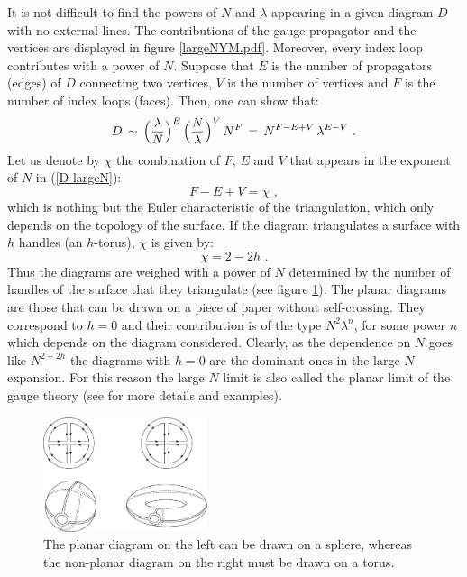 \documentclass[12pt,notitlepage,a4paper]{article}
\newcommand{\beq}{\begin{equation}}
\newcommand{\eeq}{\end{equation}}
\begin{document}
It is not difficult to find the powers of $N$ and $\lambda$ appearing in a given diagram $D$ with no external lines. The contributions of the gauge propagator and the vertices are displayed in figure \ref{largeNYM.pdf}.  Moreover, every index loop contributes with a power of $N$.  Suppose that $E$ is the number of propagators (edges) of $D$ connecting two vertices,  $V$  is the number of vertices  and $F$  is the number of index loops (faces). Then, one can show that:
\beq
D\,\sim \,\Big({\lambda\over N}\Big)^{E}\,\Big({N\over \lambda}\Big)^{V}\,N^{F}\,=\,
N^{F-E+V}\,\lambda^{E-V}\,\,.
\label{D-largeN}
\eeq
Let us denote by $\chi$ the combination of $F$, $E$ and $V$ that appears in the exponent of $N$ in (\ref{D-largeN}):
\beq
F-E+V=\chi\,\,,
\eeq
which is nothing but the Euler characteristic of the triangulation, which only depends on the topology of the surface. If the diagram triangulates a surface with $h$ handles (an $h$-torus), $\chi$ is given by:
\beq
\chi=2-2h\,\,.
\eeq
Thus the diagrams are weighed  with a power of $N$ determined by the number of handles of the surface that they triangulate (see figure \ref{planar_and_nonplanar}). The planar diagrams are those that can be drawn on a piece of paper without self-crossing. They correspond to $h=0$ and their contribution is of the type $N^2\lambda^n$, for some power $n$ which depends on the diagram considered. Clearly, as the dependence on $N$ goes like $N^{2-2h}$ the diagrams with $h=0$ are the dominant ones in the large $N$ expansion. For this reason the large $N$ limit is also called the planar limit of the gauge theory (see \cite{Manohar:1998xv} for more details and examples).


\begin{figure}[ht]
\center
\includegraphics[width=0.43\textwidth]{genus.pdf}
\caption{The planar diagram  on the left can be drawn on a sphere, whereas the non-planar diagram on the right must be drawn on a torus.} 
\label{planar_and_nonplanar}
\end{figure}
\end{document}
